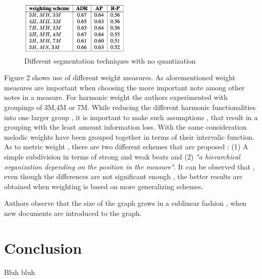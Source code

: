 \documentclass{llncs}
\begin{document}
			\begin{figure}[h!]
			\centering
			\includegraphics[width=200px,height=100px,keepaspectratio]{three_of_two_point_four}
			\caption{Different segmentation techniques with no quantization \cite{two_point_four}}
			\end{figure}

			Figure 2 shows use of different weight measures. As aforementioned weight measures are important when choosing the more important note among other notes in a measure. For harmonic weight the authors experimented with groupings of 3M,4M or 7M. While reducing the different harmonic functionalities into one larger group , it is important to make such assumptions , that result in a grouping with the least amount information loss. With the same consideration melodic weights have been grouped together in terms of their intervalic function. As to metric weight , there are two different schemes that are proposed : (1) A simple subdivision in terms of strong and weak beats and (2) \textit{"a hierarchical organization depending on the position in the measure"}. It can be observed that , even though the differences are not significant enough , the better results are obtained when weighting is based on more generalizing schemes.

			Authors observe that the size of the graph grows in a sublinear fashion , when new documents are introduced to the graph.   




	\section{Conclusion}
		Bluh bluh
		
	
\end{document}
